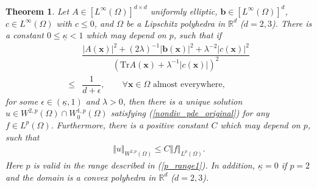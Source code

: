 \documentclass[12pt]{amsart}
\newcommand{\boldx}{\boldsymbol{x}}
\newtheorem{theorem}{Theorem}[section]
\theoremstyle{definition}
\theoremstyle{remark}
\begin{document}
\begin{theorem}
\label{thm_pde_cordes}
Let $A \in [L^{\infty}(\Omega)]^{d\times d}$ uniformly elliptic, $\boldsymbol{b}\in [L^{\infty}(\Omega)]^{d}$, 
$c \in L^{\infty}(\Omega)$ with $c \leq 0$, and $\Omega$ be a Lipschitz polyhedra in $\mathbb{R}^{d}$ ($d=2,3$).  
There is a constant $0\leq \underline{\kappa}<1$ 
which may depend on $p$, such that if 
\begin{align}
\label{Cordes_coefficients_strong_nondiv_pde_general}
& \dfrac{ \vert A(\boldx)\vert^{2} 
+ (2\lambda)^{-1}\vert \boldsymbol{b}(\boldx)\vert^{2} 
+ \lambda^{-2}\vert c(\boldx)\vert^{2}}{\left( 
\text{Tr}A(\boldx) + \lambda^{-1}
\vert c(\boldx)\vert\right)^{2}} \\
\nonumber 
\leq & \dfrac{1}{d+ \epsilon}, \qquad
\forall \boldx \in \Omega \text{ almost everywhere},
\end{align}
for some $\epsilon \in (\underline{\kappa},1)$ and $\lambda > 0$,
then there is a unique solution $u \in W^{2,p}(\Omega)
\cap W_{0}^{1,p}(\Omega)$ satisfying (\ref{nondiv_pde_original}) 
for any $f \in L^{p}(\Omega)$. 
Furthermore, there is a positive constant $C$ which may depend on $p$, such that
\begin{align*}
\Vert u\Vert_{W^{2,p}(\Omega)} \leq C \Vert f\Vert_{L^{p}(\Omega)}.
\end{align*}
Here $p$ is valid in the range described in (\ref{p_range1}). 
In addition, $\underline{\kappa} = 0$ if $p=2$ and 
the domain is a convex polyhedra in $\mathbb{R}^{d}$ ($d=2,3$).
\end{theorem}
\end{document}
